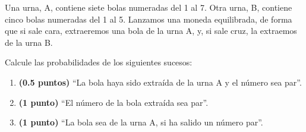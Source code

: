 
Una urna, A, contiene siete bolas numeradas del 1 al 7. Otra urna, B, contiene cinco bolas numeradas del 1 al 5. Lanzamos una moneda equilibrada, de forma que si sale cara, extraeremos una bola de la urna A, y, si sale cruz, la extraemos de la urna B.

Calcule las probabilidades de los siguientes sucesos:
\begin{enumerate}[label=\alph*)]
\item \textbf{(0.5 puntos)} ``La bola haya sido extraída de la urna A y el número sea par''.
\item \textbf{(1 punto)} ``El número de la bola extraída sea par''.
\item \textbf{(1 punto)} ``La bola sea de la urna A, si ha salido un número par''.
\end{enumerate}
